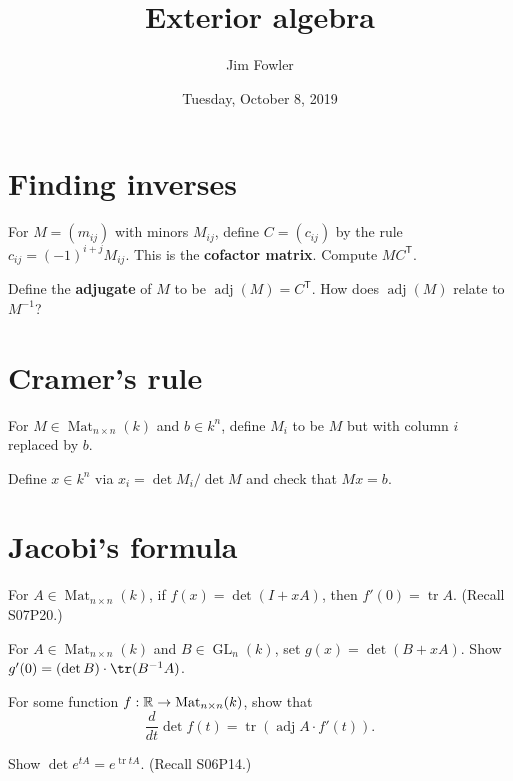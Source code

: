 \documentclass{homework}
\author{Jim Fowler}
\title{Exterior algebra}
\date{Tuesday, October 8, 2019}
\DeclareMathOperator{\Mat}{Mat}
\DeclareMathOperator{\adj}{adj}
\DeclareMathOperator{\GL}{GL}
\DeclareMathOperator{\trace}{tr}
\begin{document}
\maketitle

\section{Finding inverses}

\begin{problem}
  For $M = (m_{ij})$ with minors $M_{ij}$, define $C = (c_{ij})$ by
  the rule $c_{ij} = (-1)^{i+j} M_{ij}$.  This is the \textbf{cofactor
    matrix}.  Compute $MC^{\textsf{T}}$.
\end{problem}

\begin{problem}
  Define the \textbf{adjugate} of $M$ to be $\adj(M) = C^{\textsf{T}}$.
    How does $\adj(M)$ relate to $M^{-1}$?
\end{problem}

\section{Cramer's rule}

\begin{problem}
  For $M \in \Mat_{n \times n}(k)$ and $b \in k^n$, define $M_i$ to be
  $M$ but with column $i$ replaced by $b$.

  Define $x \in k^n$ via $x_i = \det M_i / \det M$ and check that
  $Mx = b$.
\end{problem}

\section{Jacobi's formula}

\begin{problem}
  For $A \in \Mat_{n \times n}(k)$, if $f(x) = \det(I+xA)$, then $f'(0) = \trace A$.  (Recall S07P20.)
\end{problem}

\begin{problem}
  For $A \in \Mat_{n \times n}(k)$ and $B \in \GL_{n}(k)$, set $g(x) = \det(B+xA)$.  Show $g'(0) = (\det B) \cdot \tr (B^{-1} A)$.
\end{problem}

\begin{problem}
  For some function $f : \R \to \Mat_{n \times n}(k)$, show that
  \[
    \frac{d}{dt} \det f(t) = \trace \left( \adj A \cdot f'(t) \right).
  \]
\end{problem}

\begin{problem}
  Show $\det e^{tA} = e^{\trace tA}$.  (Recall S06P14.)
\end{problem}
\end{document}
